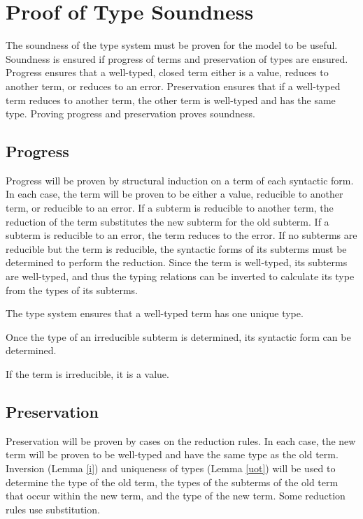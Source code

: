 \chapter{Proof of Type Soundness}

The soundness of the type system must be proven for the model to be useful.  Soundness is ensured if progress of terms and preservation of types are ensured.  Progress ensures that a well-typed, closed term either is a value, reduces to another term, or reduces to an error.  Preservation ensures that if a well-typed term reduces to another term, the other term is well-typed and has the same type.  Proving progress and preservation proves soundness.

\section{Progress}

Progress will be proven by structural induction on a term of each syntactic form.  In each case, the term will be proven to be either a value, reducible to another term, or reducible to an error.  If a subterm is reducible to another term, the reduction of the term substitutes the new subterm for the old subterm.  If a subterm is reducible to an error, the term reduces to the error.  If no subterms are reducible but the term is reducible, the syntactic forms of its subterms must be determined to perform the reduction.  Since the term is well-typed, its subterms are well-typed, and thus the typing relations can be inverted to calculate its type from the types of its subterms.



The type system ensures that a well-typed term has one unique type.



Once the type of an irreducible subterm is determined, its syntactic form can be determined.



If the term is irreducible, it is a value.



\section{Preservation}

Preservation will be proven by cases on the reduction rules.  In each case, the new term will be proven to be well-typed and have the same type as the old term.  Inversion (Lemma \ref{i}) and uniqueness of types (Lemma \ref{uot}) will be used to determine the type of the old term, the types of the subterms of the old term that occur within the new term, and the type of the new term.  Some reduction rules use substitution.


